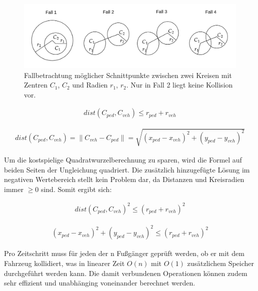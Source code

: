 \begin{figure}[h]
  \centering
  \includegraphics[width = 1.0\textwidth]{imgs/circle_intersections}
  \caption{Fallbetrachtung möglicher Schnittpunkte zwischen zwei Kreisen mit Zentren $C_1$, $C_2$
  und Radien $r_1$, $r_2$. Nur in Fall 2 liegt keine Kollision vor.}
  \label{fig:circle_intersect}
\end{figure}

\begin{equation}
\begin{aligned}
dist(C_{ped}, C_{veh}) \le r_{ped} + r_{veh}
\end{aligned}
\end{equation}

\begin{equation}
\begin{aligned}
dist(C_{ped}, C_{veh}) = \lVert C_{veh} - C_{ped} \rVert
= \sqrt{(x_{ped} - x_{veh})^2 + (y_{ped} - y_{veh})^2}
\end{aligned}
\end{equation}

Um die kostspielige Quadratwurzelberechnung zu sparen, wird die Formel
auf beiden Seiten der Ungleichung quadriert. Die zusätzlich hinzugefügte Lösung
im negativen Wertebereich stellt kein Problem dar, da Distanzen und Kreisradien
immer $\ge 0$ sind. Somit ergibt sich:

\begin{equation}
\begin{aligned}
dist(C_{ped}, C_{veh})^2 \le (r_{ped} + r_{veh})^2
\end{aligned}
\end{equation}

\begin{equation}
\begin{aligned}
(x_{ped} - x_{veh})^2 + (y_{ped} - y_{veh})^2 \le (r_{ped} + r_{veh})^2
\end{aligned}
\end{equation}

Pro Zeitschritt muss für jeden der n Fußgänger geprüft werden, ob er mit dem Fahrzeug
kollidiert, was in linearer Zeit $O(n)$ mit $O(1)$ zusätzlichem Speicher durchgeführt
werden kann. Die damit verbundenen Operationen können zudem sehr effizient und
unabhänging voneinander berechnet werden.

